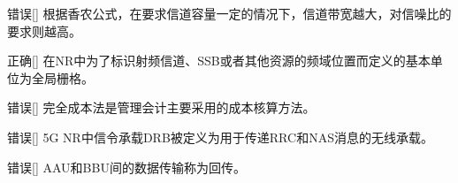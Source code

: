\begin{choice}{\;错误\;}[]
    根据香农公式，在要求信道容量一定的情况下，信道带宽越大，对信噪比的要求则越高。

\end{choice}

\begin{choice}{\;正确\;}[]
    在NR中为了标识射频信道、SSB或者其他资源的频域位置而定义的基本单位为全局栅格。

\end{choice}

\begin{choice}{\;错误\;}[]
    完全成本法是管理会计主要采用的成本核算方法。

\end{choice}

\begin{choice}{\;错误\;}[]
    5G NR中信令承载DRB被定义为用于传递RRC和NAS消息的无线承载。

\end{choice}

\begin{choice}{\;错误\;}[]
    AAU和BBU间的数据传输称为回传。

\end{choice}





